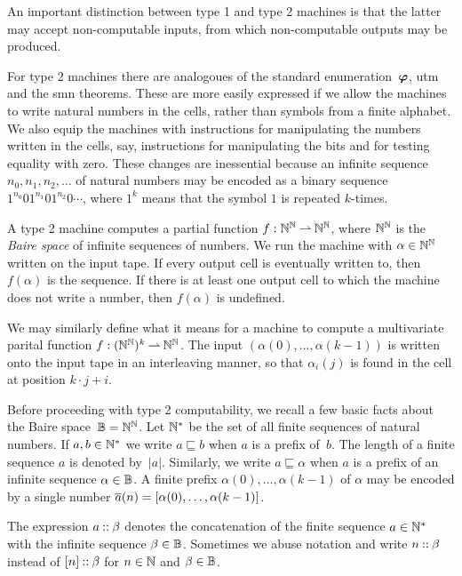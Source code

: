 An important distinction between type 1 and type 2 machines is that
the latter may accept non-computable inputs, from which non-computable
outputs may be produced.

For type 2 machines there are analogoues of the standard
enumeration~$\text{\boldmath{$\varphi$}}$, utm and the smn theorems. These are more easily
expressed if we allow the machines to write natural numbers in the
cells, rather than symbols from a finite alphabet. We also equip the
machines with instructions for manipulating the numbers written in the
cells, say, instructions for manipulating the bits and for testing
equality with zero. These changes are inessential because an infinite
sequence $n_0, n_1, n_2, \ldots$ of natural numbers may be encoded as
a binary sequence $1^{n_0}01^{n_1}01^{n_2}0\cdots$, where $1^k$ means
that the symbol $1$ is repeated $k$-times.

A type 2 machine computes a partial function $f : \mathbb{N}^{\mathbb{N}} \mathbin{\rightharpoonup}
\mathbb{N}^{\mathbb{N}}$, where $\mathbb{N}^{\mathbb{N}}$ is the \emph{Baire space} of infinite
sequences of numbers. We run the machine with $\alpha \in \mathbb{N}^{\mathbb{N}}$
written on the input tape. If every output cell is eventually written
to, then $f(\alpha)$ is the sequence. If there is at least one output
cell to which the machine does not write a number, then $f(\alpha)$ is
undefined.

We may similarly define what it means for a machine to compute a
multivariate parital function $f : (\mathbb{N}^{\mathbb{N}})^k \mathbin{\rightharpoonup} \mathbb{N}^{\mathbb{N}}$. The
input $(\alpha(0), \ldots, \alpha(k-1))$ is written onto the input tape in
an interleaving manner, so that $\alpha_i(j)$ is found in the cell at
position $k \cdot j + i$.

Before proceeding with type 2 computability, we recall a few basic
facts about the Baire space~$\mathbb{B} = \mathbb{N}^{\mathbb{N}}$. Let $\mathbb{N}^{*}$ be the
set of all finite sequences of natural numbers. If $a, b \in \mathbb{N}^{*}$
we write $a \sqsubseteq b$ when $a$ is a prefix of~$b$. The length of
a finite sequence $a$ is denoted by~$|a|$. Similarly, we write $a
\sqsubseteq \alpha$ when $a$ is a prefix of an infinite sequence
$\alpha \in \mathbb{B}$. A finite prefix $\alpha(0), \ldots, \alpha(k-1)$
of $\alpha$ may be encoded by a single number $\overline{a}(n) =
[\alpha(0), \ldots, \alpha(k-1)]$.

The expression $a \mathbin{{:}{:}} \beta$ denotes the concatenation of the
finite sequence $a \in \mathbb{N}^{*}$ with the infinite sequence $\beta \in
\mathbb{B}$. Sometimes we abuse notation and write $n \mathbin{{:}{:}} \beta$
instead of $[n] \mathbin{{:}{:}} \beta$ for $n \in \mathbb{N}$ and $\beta \in
\mathbb{B}$.

